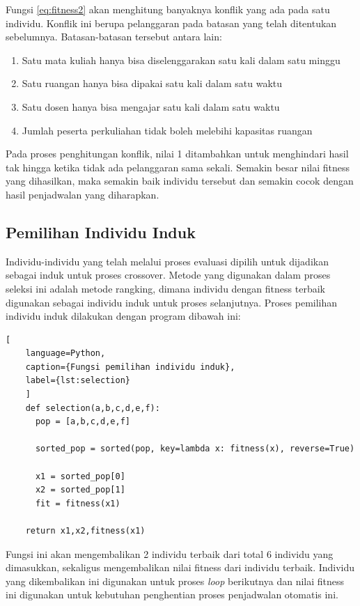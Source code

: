   Fungsi \ref{eq:fitness2} akan menghitung banyaknya konflik yang ada pada satu individu. Konflik ini berupa pelanggaran pada batasan yang telah ditentukan sebelumnya.
  Batasan-batasan tersebut antara lain:
  \begin{enumerate}
    \item Satu mata kuliah hanya bisa diselenggarakan satu kali dalam satu minggu
    \item Satu ruangan hanya bisa dipakai satu kali dalam satu waktu
    \item Satu dosen hanya bisa mengajar satu kali dalam satu waktu
    \item Jumlah peserta perkuliahan tidak boleh melebihi kapasitas ruangan
  \end{enumerate} 
 Pada proses penghitungan konflik, nilai 1 ditambahkan untuk menghindari hasil tak hingga ketika tidak ada pelanggaran sama sekali. 
 Semakin besar nilai fitness yang dihasilkan, maka semakin baik individu tersebut dan semakin cocok dengan hasil penjadwalan yang diharapkan. 
\subsection{Pemilihan Individu Induk}
  
  Individu-individu yang telah melalui proses evaluasi dipilih untuk dijadikan sebagai \linebreak induk untuk proses crossover.
  Metode yang digunakan dalam proses seleksi ini adalah metode \linebreak rangking, dimana individu dengan fitness terbaik digunakan sebagai individu induk untuk proses selanjutnya. 
  Proses pemilihan individu induk dilakukan dengan program dibawah ini:
  \begin{lstlisting}[
    language=Python,
    caption={Fungsi pemilihan individu induk},
    label={lst:selection}
    ]
    def selection(a,b,c,d,e,f):
      pop = [a,b,c,d,e,f]

      sorted_pop = sorted(pop, key=lambda x: fitness(x), reverse=True)
      
      x1 = sorted_pop[0]
      x2 = sorted_pop[1]
      fit = fitness(x1)

    return x1,x2,fitness(x1)
  \end{lstlisting}
  Fungsi ini akan mengembalikan 2 individu terbaik dari total 6 individu yang dimasukkan, sekaligus mengembalikan nilai fitness dari individu terbaik. 
  Individu yang dikembalikan ini digunakan untuk proses \emph{loop} berikutnya dan nilai fitness ini digunakan untuk kebutuhan penghentian proses penjadwalan otomatis ini.
